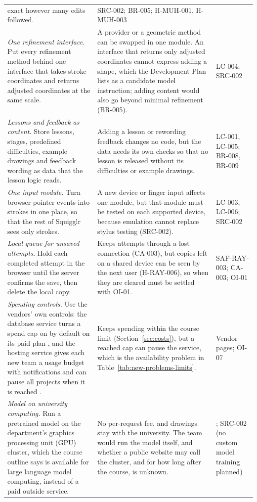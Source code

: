 \documentclass[12pt]{article}
\renewcommand{\_}{\textunderscore\allowbreak}%
\begin{document}
{\begin{longtable}{@{}>{\raggedright\arraybackslash}p{}%
>{\raggedright\arraybackslash}p{}%
>{\raggedright\arraybackslash}p{}@{}}
exact however many edits followed. & SRC-002; BR-005; H-MUH-001, H-MUH-003 \\
\addlinespace
\emph{One refinement interface.} Put every refinement method behind one
interface that takes stroke coordinates and returns adjusted coordinates at the
same scale. & A provider or a geometric method can be swapped in one module. An
interface that returns only adjusted coordinates cannot express adding a shape,
which the Development Plan lists as a candidate model instruction; adding
content would also go beyond minimal refinement (BR-005). & LC-004; SRC-002 \\
\addlinespace
\emph{Lessons and feedback as content.} Store lessons, stages, predefined
difficulties, example drawings and feedback wording as data that the lesson
logic reads. & Adding a lesson or rewording feedback changes no code, but the
data needs its own checks so that no lesson is released without its difficulties
or example drawings. & LC-001, LC-005; BR-008, BR-009 \\
\addlinespace
\emph{One input module.} Turn browser pointer events into strokes in one place,
so that the rest of Squigglr sees only strokes. & A new device or finger input
affects one module, but that module must be tested on each supported device,
because emulation cannot replace stylus testing (SRC-002). & LC-003, LC-006;
SRC-002 \\
\addlinespace
\emph{Local queue for unsaved attempts.} Hold each completed attempt in the
browser until the server confirms the save, then delete the local copy. & Keeps
attempts through a lost connection (CA-003), but copies left on a shared device
can be seen by the next user (H-RAY-006), so when they are cleared must be
settled with OI-01. & SAF-RAY-003; CA-003; OI-01 \\
\addlinespace
\emph{Spending controls.} Use the vendors' own controls: the database service
turns a spend cap on by default on its paid plan \citep{Supabase2026Pricing},
and the hosting service gives each new team a usage budget with notifications
and can pause all projects when it is reached \citep{Vercel2026Pricing}. & Keeps
spending within the course limit (Section~\ref{sec:costs}), but a reached cap
can pause the service, which is the availability problem in
Table~\ref{tab:new-problems-limits}. & Vendor pages; OI-07 \\
\addlinespace
\emph{Model on university computing.} Run a pretrained model on the department's
graphics processing unit (GPU) cluster, which the course outline says is
available for large language model computing, instead of a paid outside service.
& No per-request fee, and drawings stay with the university. The team would run
the model itself, and whether a public website may call the cluster, and for how
long after the course, is unknown. & \citep{Smith2026Outline}; SRC-002 (no
custom model training planned) \\
\end{longtable}
}
\end{document}
